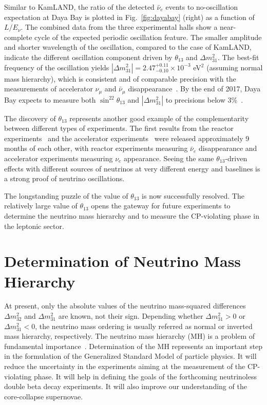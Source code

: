 \documentclass[aps,twocolumn,preprintnumbers,amsmath,superscriptaddress,amssymb,floats,nofootinbib]{revtex4-1}
\begin{document}
Similar to KamLAND, the ratio of the detected $\bar\nu_{e}$ events to no-oscillation expectation at Daya Bay is plotted in Fig.~\ref{fig:dayabay} (right) as a function of $L/E_{\nu}$. 
The combined data from the three experimental halls show a near-complete cycle of the expected periodic oscillation feature. 
The smaller amplitude and shorter wavelength of the oscillation, compared to the case of KamLAND, indicate the different oscillation component driven by $\theta_{13}$ and $\Delta{m}^2_{31}$. 
The best-fit frequency of the oscillation yields $|\Delta{m}^2_{31}| = 2.47^{+0.11}_{-0.10} \times 10^{-3}$ eV$^2$ (assuming normal mass hierarchy), which is consistent and of comparable precision with the measurements of accelerator $\nu_\mu$ and $\bar\nu_\mu$ disappearance~\cite{MINOS2014,T2K2014}. 
By the end of 2017, Daya Bay expects to measure both $\sin^22\theta_{13}$ and $|\Delta{m}^2_{31}|$ to precisions below 3\%~\cite{Zhang-Neutrino14}.

The discovery of $\theta_{13}$ represents another good example of the complementarity between different types of experiments. The first results from the reactor experiments~\cite{DChooz,Dayabay,Reno} and the accelerator experiments~\cite{T2K2011,MINOS2011} were released approximately 9 months of each other, with reactor experiments measuring $\bar\nu_e$ disappearance and accelerator experiments measuring $\nu_e$ appearance. Seeing the same $\theta_{13}$-driven effects with different sources 
of neutrinos at very different energy and baselines is a strong proof of neutrino oscillations.

The longstanding puzzle of the value of $\theta_{13}$ is now successfully resolved.
The relatively large value of $\theta_{13}$ opens the gateway for future experiments to determine the neutrino mass hierarchy and 
to measure the CP-violating phase in the leptonic sector.


\section{Determination of Neutrino Mass Hierarchy}

At present, only the absolute values of the neutrino mass-squared differences $\Delta m^2_{32}$ and $\Delta m^2_{31}$ are known, not their sign. 
Depending whether $\Delta m^2_{31}>0$ or $\Delta m^2_{31}<0$, the neutrino mass ordering is usually referred as normal or inverted mass hierarchy, respectively. 
The neutrino mass hierarchy (MH) is a problem of fundamental importance~\cite{MHwhitepaper}.
Determination of the MH represents an important step in the formulation of the Generalized Standard Model of particle physics. 
It will reduce the uncertainty in the experiments aiming at the measurement of the CP-violating phase. 
It will help in defining the goals of the forthcoming neutrinoless double beta decay experiments.
It will also improve our understanding of the core-collapse supernovae.
\end{document}
